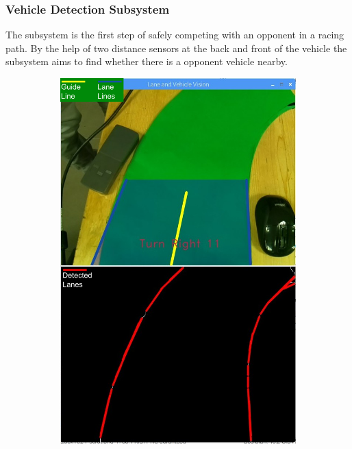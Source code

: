 \documentclass[a4paper,12pt]{article}
\begin{document}
	
	
	\subsubsection{Vehicle Detection Subsystem}
	
	The subsystem is the first step of safely competing with an opponent in a racing path. By the help of two distance sensors at the back and front of the vehicle the subsystem aims to find whether there is a opponent vehicle nearby.
	
	
		
	\begin{figure}[H]
		\setlength{\unitlength}{\textwidth} 
		\centering
		\begin{subfigure}{.5\textwidth}
	  		\centering
	  		\includegraphics[width=0.48\unitlength]{images/detection1-legend}

\end{subfigure}
\end{figure}
\end{document}
